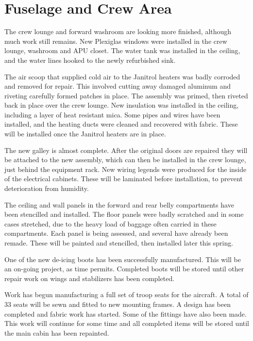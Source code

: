 \section{Fuselage and Crew Area}
\label{empennage}

The crew lounge and forward washroom are looking more finished,
although much work still remains.  New Plexiglas windows were
installed in the crew lounge, washroom and APU closet.  The water tank
was installed in the ceiling, and the water lines hooked to the newly
refurbished sink. 
 
The air scoop that supplied cold air to the Janitrol heaters was badly
corroded and removed for repair.  This involved cutting away damaged
aluminum and riveting carefully formed patches in place.  The assembly
was primed, then riveted back in place over the crew lounge.  New
insulation was installed in the ceiling, including a layer of heat
resistant mica.  Some pipes and wires have been installed, and the
heating ducts were cleaned and recovered with fabric.  These will be
installed once the Janitrol heaters are in place.

The new galley is almost complete.  After the original doors are
repaired they will be attached to the new assembly, which can then be
installed in the crew lounge, just behind the equipment rack.  New
wiring legends were produced for the inside of the electrical
cabinets.  These will be laminated before installation, to prevent
deterioration from humidity.

The ceiling and wall panels in the forward and rear belly compartments
have been stencilled and installed.  The floor panels were badly
scratched and in some cases stretched, due to the heavy load of
baggage often carried in these compartments.  Each panel is being
assessed, and several have already been remade.  These will be painted
and stencilled, then installed later this spring.

One of the new de-icing boots has been successfully manufactured.
This will be an on-going project, as time permits.  Completed boots
will be stored until other repair work on wings and stabilizers has
been completed.

Work has begun manufacturing a full set of troop seats for the
aircraft.  A total of 33 seats will be sewn and fitted to new mounting
frames.  A design has been completed and fabric work has started.
Some of the fittings have also been made.  This work will continue for
some time and all completed items will be stored until the main cabin
has been repainted. 


